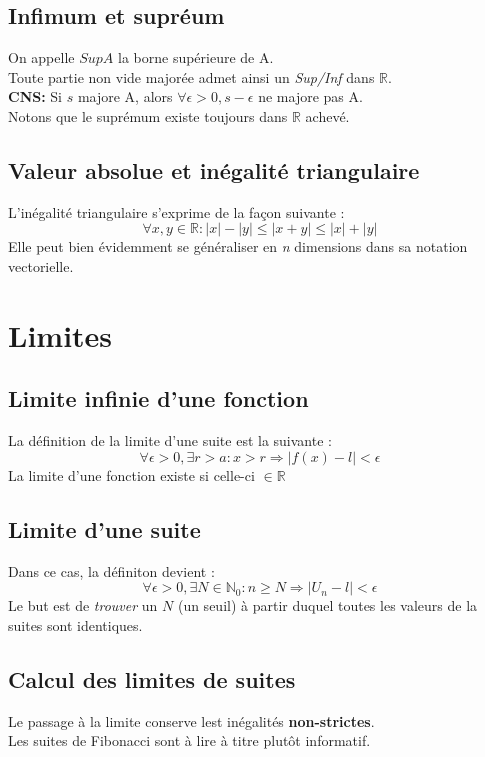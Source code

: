 \documentclass	[11pt, a4paper, openany]{book}
\begin{document}
\section{Infimum et supréum}
On appelle $SupA$ la borne supérieure de A.\\
Toute partie non vide  majorée admet ainsi un \textit{Sup/Inf} dans $\mathbb{R}$.\\
\textbf{CNS:} Si $s$ majore A, alors $\forall \epsilon > 0, s- \epsilon $ ne majore pas A.\\
Notons que le suprémum existe toujours dans $\mathbb{R}$ achevé.

\section{Valeur absolue et inégalité triangulaire}
L'inégalité triangulaire s'exprime de la façon suivante :
$$ \forall x, y \in \mathbb{R} : |x| - |y| \leq |x + y| \leq |x| + |y| $$
Elle peut bien évidemment se généraliser en \textit{n} dimensions dans sa notation vectorielle.

\chapter{Limites}
\section{Limite infinie d'une fonction}
La définition de la limite d'une suite est la suivante :
$$ \forall \epsilon > 0, \exists r > a : x > r \Rightarrow |f(x) - l| < \epsilon $$
La limite d'une fonction existe si celle-ci $\in \mathbb{R}$

\section{Limite d'une suite}
Dans ce cas, la définiton devient :
$$ \forall \epsilon > 0, \exists N \in \mathbb{N}_{0} : n \geq N \Rightarrow |U_{n} - l| < \epsilon$$
Le but est de \textit{trouver} un $N$ (un seuil) à partir duquel toutes les valeurs de la suites sont identiques.\\


\section*{Calcul des limites de suites}
Le passage à la limite conserve lest inégalités \textbf{non-strictes}.\\
Les suites de Fibonacci sont à lire à titre plutôt informatif.
\end{document}
